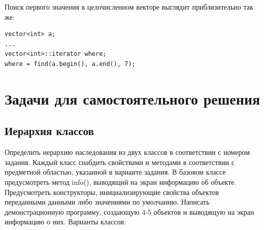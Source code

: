 Поиск первого значения в целочисленном векторе выглядит приблизительно так же:
\begin{lstlisting}
vector<int> a;
...
vector<int>::iterator where;
where = find(a.begin(), a.end(), 7);
\end{lstlisting}

\section[Задачи для самостоятельного решения]{Задачи для самостоятельного решения}
\subsection[Иерархия классов]{Иерархия классов}\label{ch10:7.1}
Определить иерархию наследования из двух классов в соответствии с номером задания.
Каждый класс снабдить свойствами и методами в соответствии с предметной областью, указанной в варианте задания. В
базовом классе предусмотреть метод info(), выводящий на экран информацию об объекте. Предусмотреть конструкторы,
инициализирующие свойства объектов переданными данными либо значениями по умолчанию. Написать демонстрационную
программу, создающую 4-5 объектов и выводящую на экран информацию о них. Варианты классов:

